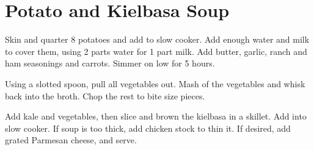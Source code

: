 \section{Potato and Kielbasa Soup}
\begin{recipe}



	Skin and quarter 8 potatoes and add to slow cooker. Add enough water and milk to cover them, using 2 parts water for 1 part milk. Add butter, garlic, ranch and ham seasonings and carrots. Simmer on low for 5 hours.

	Using a slotted spoon, pull all vegetables out. Mash  of the vegetables and whisk back into the broth. Chop the rest to bite size pieces.

	Add kale and vegetables, then slice and brown the kielbasa in a skillet. Add into slow cooker. If soup is too thick, add chicken stock to thin it. If desired, add grated Parmesan cheese, and serve.

\end{recipe}
